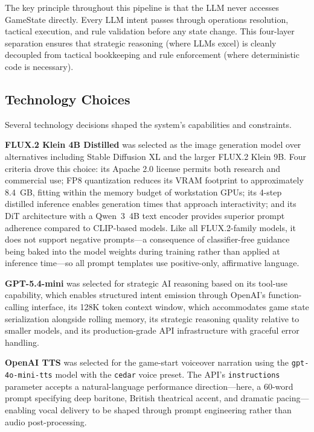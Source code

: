 \documentclass[conference]{IEEEtran}
\begin{document}
The key principle throughout this pipeline is that the LLM never accesses
GameState directly. Every LLM intent passes through operations resolution,
tactical execution, and rule validation before any state change. This
four-layer separation ensures that strategic reasoning (where LLMs excel)
is cleanly decoupled from tactical bookkeeping and rule enforcement (where
deterministic code is necessary).

\subsection{Technology Choices}

Several technology decisions shaped the system's capabilities and
constraints.

\textbf{FLUX.2 Klein 4B Distilled} was selected as the image generation
model over alternatives including Stable Diffusion XL and the larger
FLUX.2 Klein 9B. Four criteria drove this choice: its Apache 2.0 license
permits both research and commercial use; FP8 quantization reduces its VRAM
footprint to approximately 8.4~GB, fitting within the memory budget of
workstation GPUs; its 4-step distilled inference enables generation times
that approach interactivity; and its DiT architecture with a Qwen~3~4B text
encoder provides superior prompt adherence compared to CLIP-based models.
Like all FLUX.2-family models, it does not support negative prompts---a
consequence of classifier-free guidance being baked into the model weights
during training rather than applied at inference time---so all prompt
templates use positive-only, affirmative language.

\textbf{GPT-5.4-mini} was selected for strategic AI reasoning based on its
tool-use capability, which enables structured intent emission through
OpenAI's function-calling interface, its 128K token context window, which
accommodates game state serialization alongside rolling memory, its
strategic reasoning quality relative to smaller models, and its
production-grade API infrastructure with graceful error handling.

\textbf{OpenAI TTS} was selected for the game-start voiceover
narration using the \texttt{gpt-4o-mini-tts} model with the \texttt{cedar}
voice preset. The API's \texttt{instructions} parameter accepts a natural-language
performance direction---here, a 60-word prompt specifying deep baritone,
British theatrical accent, and dramatic pacing---enabling vocal delivery to
be shaped through prompt engineering rather than audio post-processing.
\end{document}
